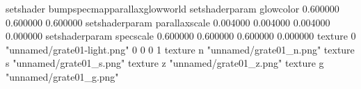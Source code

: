 setshader bumpspecmapparallaxglowworld
setshaderparam glowcolor 0.600000 0.600000 0.600000
setshaderparam parallaxscale 0.004000 0.004000 0.004000 0.000000
setshaderparam specscale 0.600000 0.600000 0.600000 0.000000
texture 0 "unnamed/grate01-light.png" 0 0 0 1
texture n "unnamed/grate01_n.png"
texture s "unnamed/grate01_s.png"
texture z "unnamed/grate01_z.png"
texture g "unnamed/grate01_g.png"